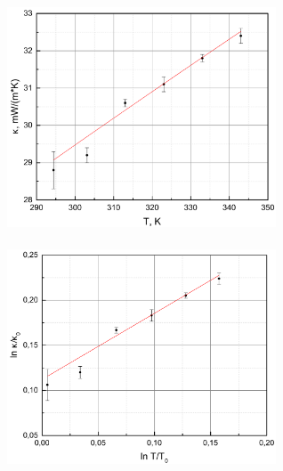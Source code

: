 \documentclass[a4paper,12pt]{article} %
\begin{document}
\begin{enumerate}
\begin{figure}[h!]
\begin{floatrow}
         {\includegraphics[width=8cm,height=7cm]{Graph_8_1}}
         {\includegraphics[width=8cm,height=7cm]{Graph_8_2}}         
\end{floatrow}
\end{figure}	
\end{enumerate}


\newpage
\end{document}
